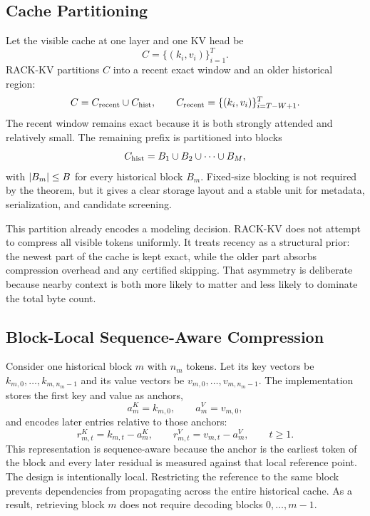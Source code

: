 \subsection{Cache Partitioning}

Let the visible cache at one layer and one KV head be
\begin{equation}
  C = \{(k_i,v_i)\}_{i=1}^{T}.
\end{equation}
RACK-KV partitions \(C\) into a recent exact window and an older historical region:
\begin{equation}
  C = C_{\mathrm{recent}} \cup C_{\mathrm{hist}},
  \qquad
  C_{\mathrm{recent}} = \{(k_i,v_i)\}_{i=T-W+1}^{T}.
\end{equation}
The recent window remains exact because it is both strongly attended and relatively small. The remaining prefix is partitioned into blocks
\begin{equation}
  C_{\mathrm{hist}} = B_1 \cup B_2 \cup \cdots \cup B_M,
\end{equation}
with \(\lvert B_m \rvert\le B\) for every historical block \(B_m\). Fixed-size blocking is not required by the theorem, but it gives a clear storage layout and a stable unit for metadata, serialization, and candidate screening.

This partition already encodes a modeling decision. RACK-KV does not attempt to compress all visible tokens uniformly. It treats recency as a structural prior: the newest part of the cache is kept exact, while the older part absorbs compression overhead and any certified skipping. That asymmetry is deliberate because nearby context is both more likely to matter and less likely to dominate the total byte count.

\subsection{Block-Local Sequence-Aware Compression}

Consider one historical block \(m\) with \(n_m\) tokens. Let its key vectors be \(k_{m,0},\dots,k_{m,n_m-1}\) and its value vectors be \(v_{m,0},\dots,v_{m,n_m-1}\). The implementation stores the first key and value as anchors,
\begin{equation}
  a^K_m = k_{m,0}, \qquad a^V_m = v_{m,0},
\end{equation}
and encodes later entries relative to those anchors:
\begin{equation}
  r^K_{m,t} = k_{m,t} - a^K_m, \qquad
  r^V_{m,t} = v_{m,t} - a^V_m, \qquad t \ge 1.
\end{equation}
This representation is sequence-aware because the anchor is the earliest token of the block and every later residual is measured against that local reference point. The design is intentionally local. Restricting the reference to the same block prevents dependencies from propagating across the entire historical cache. As a result, retrieving block \(m\) does not require decoding blocks \(0,\dots,m-1\).

